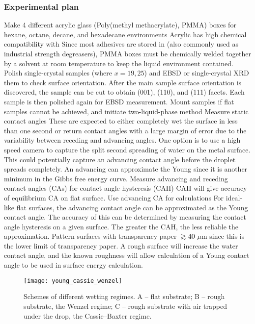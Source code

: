 \subsubsection{Experimental plan}
\begin{outline}[enumerate]
\1 Make 4 different acrylic glass (Poly(methyl methacrylate), PMMA) boxes for hexane, octane, decane, and hexadecane environments
	\2 Acrylic has high chemical compatibility with \nalk[s] \cite{Thermoscientific}		
	\2 Since most adhesives are stored in \nalk[s] (also commonly used as industrial strength degreasers), PMMA boxes must be chemically welded together by a solvent at room temperature to keep the liquid environment contained. 
\1 Polish single-crystal samples (\fegacomp where $x=19,25$) and EBSD or single-crystal XRD them to check surface orientation. After the main sample surface orientation is discovered, the sample can be cut to obtain \hkl(001), \hkl(110), and \hkl(111) facets. Each sample is then polished again for EBSD measurement. 
\1 Mount samples if flat samples cannot be achieved, and initiate two-liquid-phase method
	\2 Measure static contact angles
		\3 These are expected to either completely wet the surface in less than one second or return contact angles with a large margin of error due to the variability between receding and advancing angles. 
		\3 One option is to use a high speed camera to capture the split second spreading of water on the metal surface. This could potentially capture an advancing contact angle before the droplet spreads completely. An advancing \ca can approximate the Young \ca since it is another minimum in the Gibbs free energy curve.
	\2 Measure advancing and receding contact angles (CAs) for contact angle hysteresis (CAH)
		\3 CAH will give accuracy of equilibrium CA on flat surface. 
	\2 Use advancing CA for calculations
		\3 For ideal-like flat surfaces, the advancing contact angle can be approximated as the Young contact angle. The accuracy of this can be determined by measuring the contact angle hysteresis on a given surface. The greater the CAH, the less reliable the approximation. 
\1 Pattern surfaces with transparency paper $\gtrsim$40 $\mu$m since this is the lower limit of transparency paper. A rough surface will increase the water contact angle, and the known roughness will allow calculation of a Young contact angle to be used in surface energy calculation. 

\begin{figure}[h]
	\centering
		\texttt{[image: young\_cassie\_wenzel]}
	\caption{Schemes of different wetting regimes. A – flat substrate; B – rough substrate, the Wenzel regime; C – rough substrate with air trapped under the drop, the Cassie–Baxter regime.\cite{Whyman2008}}
	\label{fig:young_cassie_wenzel}
\end{figure}


\end{outline}
